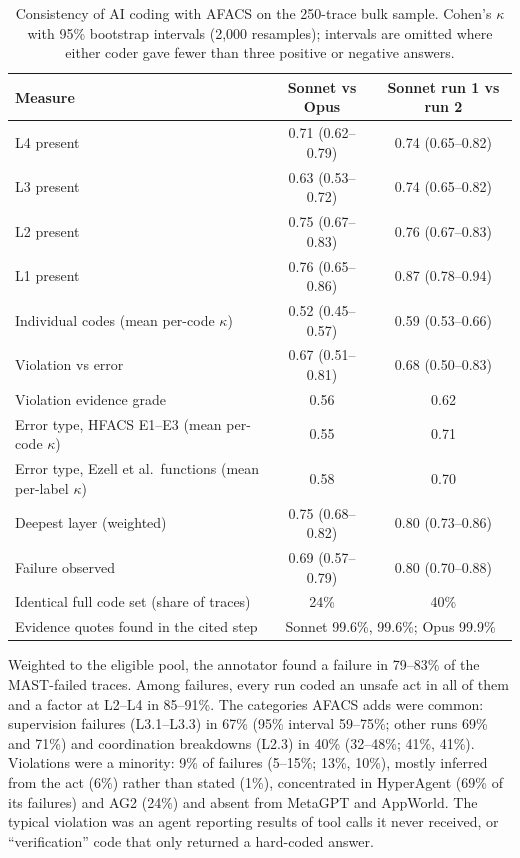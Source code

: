 \documentclass[10pt,a4paper]{article}
\begin{document}
\begin{table}[tbp]
\centering
\caption{Consistency of AI coding with AFACS on the 250-trace bulk sample.
Cohen's $\kappa$ with 95\% bootstrap intervals (2{,}000 resamples); intervals are
omitted where either coder gave fewer than three positive or negative answers.}
\label{tab:rq3}
\small
\begin{tabular}{@{}lcc@{}}
\toprule
Measure & Sonnet vs Opus & Sonnet run 1 vs run 2\\
\midrule
L4 present & 0.71 (0.62--0.79) & 0.74 (0.65--0.82)\\
L3 present & 0.63 (0.53--0.72) & 0.74 (0.65--0.82)\\
L2 present & 0.75 (0.67--0.83) & 0.76 (0.67--0.83)\\
L1 present & 0.76 (0.65--0.86) & 0.87 (0.78--0.94)\\
Individual codes (mean per-code $\kappa$) & 0.52 (0.45--0.57) & 0.59 (0.53--0.66)\\
Violation vs error & 0.67 (0.51--0.81) & 0.68 (0.50--0.83)\\
Violation evidence grade & 0.56 & 0.62\\
Error type, HFACS E1--E3 (mean per-code $\kappa$) & 0.55 & 0.71\\
Error type, Ezell et al.\ functions (mean per-label $\kappa$) & 0.58 & 0.70\\
Deepest layer (weighted) & 0.75 (0.68--0.82) & 0.80 (0.73--0.86)\\
Failure observed & 0.69 (0.57--0.79) & 0.80 (0.70--0.88)\\
Identical full code set (share of traces) & 24\% & 40\%\\
Evidence quotes found in the cited step & \multicolumn{2}{c}{Sonnet 99.6\%, 99.6\%; Opus 99.9\%}\\
\bottomrule
\end{tabular}
\end{table}

Weighted to the eligible pool, the annotator found a failure in 79--83\% of the
MAST-failed traces. Among failures, every run coded an unsafe act in all of them
and a factor at L2--L4 in 85--91\%. The categories AFACS adds were common:
supervision failures (L3.1--L3.3) in 67\% (95\% interval 59--75\%; other runs 69\%
and 71\%) and coordination breakdowns (L2.3) in 40\% (32--48\%; 41\%, 41\%).
Violations were a minority: 9\% of failures (5--15\%; 13\%, 10\%), mostly inferred
from the act (6\%) rather than stated (1\%), concentrated in HyperAgent (69\% of its
failures) and AG2 (24\%) and absent from MetaGPT and AppWorld. The typical
violation was an agent reporting results of tool calls it never received, or
``verification'' code that only returned a hard-coded answer.
\end{document}
